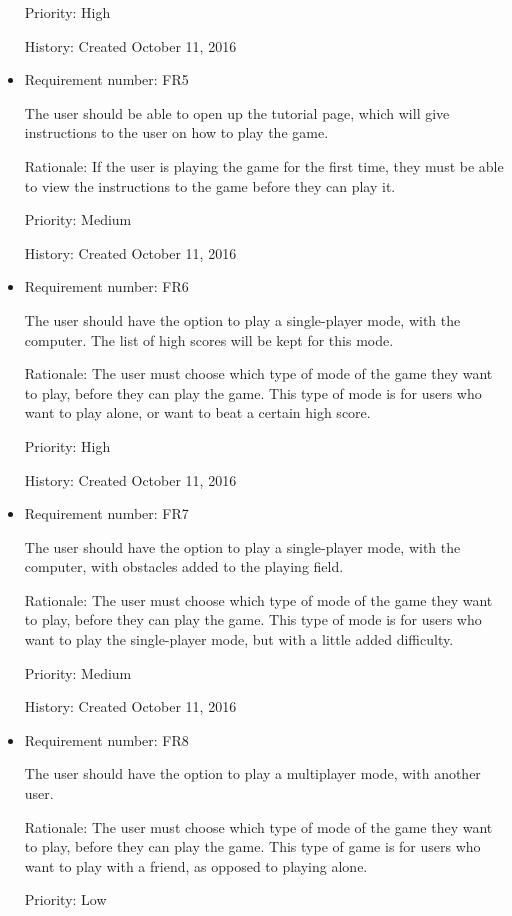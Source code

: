 \documentclass[12pt,letterpaper]{article}
\begin{document}
\begin{itemize}
		Priority: High

		History: Created October 11, 2016

		\item Requirement number: FR5

		The user should be able to open up the tutorial page, which will give instructions to the user on how to play the game.

		Rationale: If the user is playing the game for the first time, they must be able to view the instructions to the game before they can play it.

		Priority: Medium

		History: Created October 11, 2016

		\item Requirement number: FR6

		The user should have the option to play a single-player mode, with the computer. The list of high scores will be kept for this mode.

		Rationale: The user must choose which type of mode of the game they want to play, before they can play the game. This type of mode is for users who want to play alone, or want to beat a certain high score.

		Priority: High

		History: Created October 11, 2016

		\item Requirement number: FR7

		The user should have the option to play a single-player mode, with the computer, with obstacles added to the playing field. 

		Rationale: The user must choose which type of mode of the game they want to play, before they can play the game. This type of mode is for users who want to play the single-player mode, but with a little added difficulty.

		Priority: Medium

		History: Created October 11, 2016

		\item Requirement number: FR8

		The user should have the option to play a multiplayer mode, with another user.

		Rationale: The user must choose which type of mode of the game they want to play, before they can play the game. This type of game is for users who want to play with a friend, as opposed to playing alone.

		Priority: Low


\end{itemize}
\end{document}
